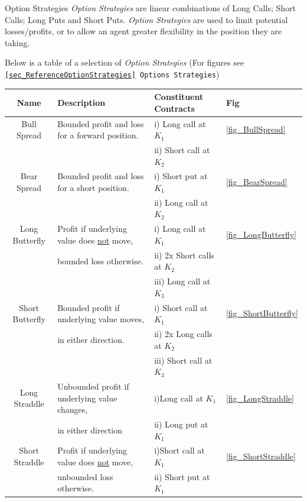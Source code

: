 \documentclass[11pt,a4paper]{article}
\begin{document}
  \begin{definition}{Option Strategies}
    \textit{Option Strategies} are linear combinations of Long Calls; Short Calls; Long Puts and Short Puts. \textit{Option Strategies} are used to limit potential losses/profits, or to allow an agent greater flexibility in the position they are taking.
    \par Below is a table of a selection of \textit{Option Strategies} (For figures see \texttt{\ref{sec_ReferenceOptionStrategies} Options Strategies})

    \begin{adjustwidth}{-1.5cm}{}
      \begin{tabular}{|c|l|l|l|}
        \hline
        \textbf{Name}&\textbf{Description}&\textbf{Constituent Contracts}&\textbf{Fig}\\
        \hline
        Bull Spread&Bounded profit and loss for a forward position.&i) Long call at $K_1$&\ref{fig_BullSpread} \\
        &&ii) Short call at $K_2$&\\\hline

        Bear Spread&Bounded profit and loss for a short position.&i) Short put at $K_1$&\ref{fig_BearSpread}\\
        &&ii) Long call at $K_2$&\\\hline

        Long Butterfly&Profit if underlying value does \underline{not} move,&i) Long call at $K_1$&\ref{fig_LongButterfly}\\
        &bounded loss otherwise.&ii) 2x Short calls at $K_2$&\\
        &&iii) Long call at $K_3$&\\\hline

        Short Butterfly&Bounded profit if underlying value moves,&i) Short call at $K_1$&\ref{fig_ShortButterfly}\\
        &in either direction.&ii) 2x Long calls at $K_2$&\\
        &&iii) Short call at $K_3$&\\\hline

        Long Straddle&Unbounded profit if underlying value changes,&i)Long call at $K_1$&\ref{fig_LongStraddle}\\
        &in either direction&ii) Long put at $K_1$&\\\hline

        Short Straddle&Profit if underlying value does \underline{not} move,&i)Short call at $K_1$&\ref{fig_ShortStraddle}\\
        &unbounded loss otherwise.&ii) Short put at $K_1$&\\\hline


\end{tabular}
\end{adjustwidth}
\end{definition}
\end{document}
